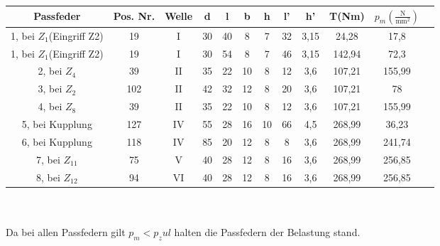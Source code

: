 \begin{tabular}{|c|c|c|c|c|c|c|c|c|c|c|c|}\hline
	 Passfeder & Pos. Nr. &Welle & d & l & b & h & l' & h' & T(Nm) & $p_m(\frac{\text{N}}{\text{mm}^2})$ \\ \hline \hline
	 1, bei $Z_1$(Eingriff Z2) & 19 & $\mathrm{I}$ &30 & 40 & 8 & 7 & 32 & 3,15 & 24,28 & 17,8 \\ \hline
	 1, bei $Z_1$(Eingriff Z2) & 19 & $\mathrm{I}$ &30 & 54 & 8 & 7 & 46 & 3,15 & 142,94 & 72,3 \\ \hline
	 2, bei $Z_4$ & 39 &$\mathrm{II}$ & 35 & 22 & 10 & 8 & 12 & 3,6 & 107,21 & 155,99 \\ \hline
	 3, bei $Z_2$ & 102 &$\mathrm{II}$ & 42 & 32 & 12 & 8 & 20 & 3,6 & 107,21 & 78 \\ \hline
	4, bei $Z_8$ & 39 &$\mathrm{II}$ & 35 & 22 & 10 & 8 & 12 & 3,6 & 107,21 & 155,99 \\ \hline
	5, bei Kupplung & 127 & $\mathrm{IV}$ & 55 & 28 & 16 & 10 & 66 & 4,5 & 268,99 & 36,23 \\ \hline
	 6, bei Kupplung & 118 &$\mathrm{IV}$ & 85 & 20 & 12 & 8 & 8 & 3,6 & 268,99 & 241,74 \\ \hline
	 7, bei $Z_{11}$ & 75 &$\mathrm{V}$ & 40 & 28 & 12 & 8 & 16 & 3,6 & 268,99 & 256,85 \\ \hline
	 8, bei $Z_{12}$ & 94 &$\mathrm{VI}$ & 40 & 28 & 12 & 8 & 16 & 3,6 & 268,99 & 256,85 \\ \hline
\end{tabular} \\
\vspace{.5cm}
\\ Da bei allen Passfedern gilt $p_m < p_zul$ halten die Passfedern der Belastung stand.
